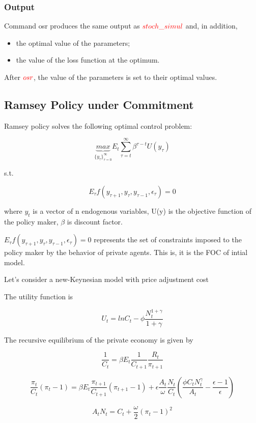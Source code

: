 \documentclass[cn,10pt,math=newtx,citestyle=gb7714-2015,bibstyle=gb7714-2015]{elegantbook}
\begin{document}
	\subsubsection{Output}
	
	Command osr produces the same output as $\textcolor{red}{stoch\_simul}$ and, in addition,
	\begin{itemize}
		\item the optimal value of the parameters;
		\item the value of the loss function at the optimum.
	\end{itemize}
	After $\textcolor{red}{osr}$, the value of the parameters is set to their optimal values.
	
	\subsection{Ramsey Policy under Commitment}
	
	Ramsey policy solves the following optimal control problem:
	
	$$\underbrace{max}_{\{y_{\tau}\}_{\tau=0}^{\infty}}E_t\sum_{\tau=t}^{\infty}\beta^{\tau-t}U(y_{\tau})$$
	
	s.t.
	
	$$E_{\tau}f(y_{\tau+1},y_{\tau},y_{\tau-1},\epsilon_{\tau})=0$$
	
	where $y_t$ is a vector of n endogenous variables, U(y) is the objective function of the policy maker, $\beta$ is discount factor.
	
	$E_{\tau}f(y_{\tau+1},y_{\tau},y_{\tau-1},\epsilon_{\tau})=0$ represents the set of constraints imposed to the policy maker by the behavior of private agents. This is, it is the FOC of intial model.
	
	Let’s consider a new-Keynesian model with price adjustment cost
	
	The utility function is
	
	$$U_t=lnC_t-\phi\frac{N_t^{1+\gamma}}{1+\gamma}$$
	
	The recursive equilibrium of the private economy is given by
	
	$$\frac{1}{C_t}=\beta E_t\frac{1}{C_{t+1}}\frac{R_t}{\pi_{t+1}}$$
	
	$$\frac{\pi_t}{C_t}(\pi_t-1)=\beta E_t\frac{\pi_{t+1}}{C_{t+1}}(\pi_{t+1}-1)+\epsilon\frac{A_t}{\omega}\frac{N_t}{C_t}\left(\frac{\phi C_tN_t^{\gamma}}{A_t}-\frac{\epsilon-1}{\epsilon}\right)$$
	
	$$A_tN_t=C_t+\frac{\omega}{2}(\pi_t-1)^2$$
	
\end{document}

